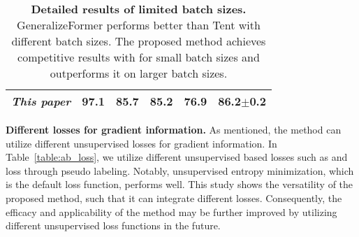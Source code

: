 \begin{table}[t]
{\begin{tabular}{llllll}
\quad \textbf{\textit{This paper}} &97.1 &85.7 & 85.2 &  76.9 & 86.2\scriptsize{$\pm$0.2} \\
\bottomrule
\end{tabular}
}
\caption{\textbf{Detailed results of limited batch sizes.} GeneralizeFormer performs better than Tent \cite{wang2021tent} with different batch sizes. The proposed method achieves competitive results with \cite{xiao2022learning} for small batch sizes and outperforms it on larger batch sizes. 
} 
\label{table:ablate_batch_size}

\end{table}


\noindent\textbf{Different losses for gradient information.}
As mentioned, the method can utilize different unsupervised losses for gradient information. In Table~\ref{table:ab_loss}, we utilize different unsupervised based losses such as \cite{zhang2021memo} and loss through pseudo labeling. Notably, unsupervised entropy minimization, which is the default loss function, performs well. This study shows the versatility of the proposed method, such that it can integrate different losses. Consequently, the efficacy and applicability of the method may be further improved by utilizing different unsupervised loss functions in the future. 





\begin{table}[h]
\centering
\vspace{-1mm}
\vspace{1mm}
\caption{\textbf{Different losses for gradient information} for ResNet-18 on PACS dataset. The proposed method can make use of different losses for the gradient information to achieve good performance. We utilize entropy minimization as the default for our experiments.}
\label{table:ab_loss}
\vspace{-4mm}
\end{table}

